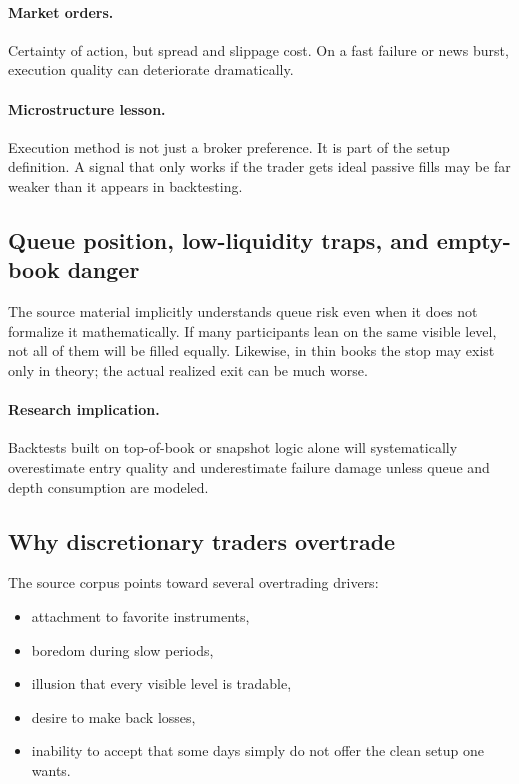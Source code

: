 \paragraph{Market orders.} Certainty of action, but spread and slippage cost. On a fast failure or news burst, execution quality can deteriorate dramatically.

\paragraph{Microstructure lesson.} Execution method is not just a broker preference. It is part of the setup definition. A signal that only works if the trader gets ideal passive fills may be far weaker than it appears in backtesting.

\subsection{Queue position, low-liquidity traps, and empty-book danger}

The source material implicitly understands queue risk even when it does not formalize it mathematically. If many participants lean on the same visible level, not all of them will be filled equally. Likewise, in thin books the stop may exist only in theory; the actual realized exit can be much worse.

\paragraph{Research implication.} Backtests built on top-of-book or snapshot logic alone will systematically overestimate entry quality and underestimate failure damage unless queue and depth consumption are modeled.

\subsection{Why discretionary traders overtrade}

The source corpus points toward several overtrading drivers:

\begin{itemize}
\item attachment to favorite instruments,
\item boredom during slow periods,
\item illusion that every visible level is tradable,
\item desire to make back losses,
\item inability to accept that some days simply do not offer the clean setup one wants.
\end{itemize}

